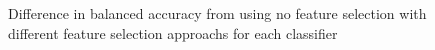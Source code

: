 \documentclass{sig-alternate-05-2015}
\begin{document}
	\begin{figure}
		\centering
		\caption{Difference in balanced accuracy from using no feature selection with different feature selection approachs for each classifier}
		\label{fig:res}
	\end{figure}
\end{document}
